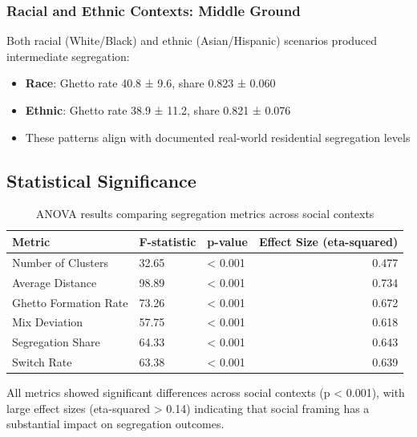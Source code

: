 \documentclass[pdflatex,sn-basic]{sn-jnl}%
\begin{document}
\subsubsection{Racial and Ethnic Contexts: Middle
Ground}\label{racial-and-ethnic-contexts-middle-ground}

Both racial (White/Black) and ethnic (Asian/Hispanic) scenarios produced
intermediate segregation: 
\begin{itemize}
\item \textbf{Race}: Ghetto rate 40.8 ± 9.6, share
0.823 ± 0.060 
\item \textbf{Ethnic}: Ghetto rate 38.9 ± 11.2, share 0.821 ±
0.076 
\item These patterns align with documented real-world residential
segregation levels
\end{itemize}

\subsection{Statistical Significance}\label{statistical-significance}


\begin{table}[ht]
\caption{ANOVA results comparing segregation metrics across social contexts}
\centering
\begin{tabular}{lllr}
\hline
Metric & F-statistic & p-value & Effect Size (eta-squared)\\
\hline
Number of Clusters & 32.65 & \textless{} 0.001 & 0.477\\
Average Distance & 98.89 & \textless{} 0.001 & 0.734\\
Ghetto Formation Rate & 73.26 & \textless{} 0.001 & 0.672\\
Mix Deviation & 57.75 & \textless{} 0.001 & 0.618\\
Segregation Share & 64.33 & \textless{} 0.001 & 0.643\\
Switch Rate & 63.38 & \textless{} 0.001 & 0.639\\
\hline
\end{tabular}
\end{table}

All metrics showed significant differences across social contexts (p \textless{} 0.001), with large effect sizes (eta-squared \textgreater{} 0.14) indicating that social framing has a substantial impact on segregation outcomes.
\end{document}
